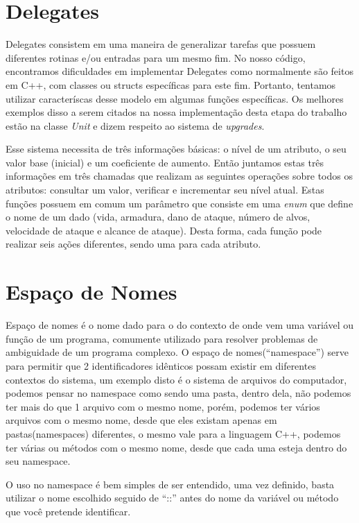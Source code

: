\documentclass[rel_mlp]{iiufrgs}
\begin{document}
 \section{Delegates}

 	Delegates consistem em uma maneira de generalizar tarefas que possuem diferentes rotinas e/ou entradas para um mesmo fim. No nosso código, encontramos dificuldades em implementar Delegates como normalmente são feitos em C++, com classes ou structs específicas para este fim. Portanto, tentamos utilizar caracteríscas desse modelo em algumas funções específicas. Os melhores exemplos disso a serem citados na nossa implementação desta etapa do trabalho estão na classe \textit{Unit} e dizem respeito ao sistema de \textit{upgrades}.

 	Esse sistema necessita de três informações básicas: o nível de um atributo, o seu valor base (inicial) e um coeficiente de aumento. Então juntamos estas três informações em três chamadas que realizam as seguintes operações sobre todos os atributos: consultar um valor, verificar e incrementar seu nível atual. Estas funções possuem em comum um parâmetro que consiste em uma \textit{enum} que define o nome de um dado (vida, armadura, dano de ataque, número de alvos, velocidade de ataque e alcance de ataque). Desta forma, cada função pode realizar seis ações diferentes, sendo uma para cada atributo.

    \section{Espaço de Nomes}
   Espaço de nomes é o nome dado para o do contexto de onde vem uma variável ou função de um programa, comumente utilizado para resolver problemas de ambiguidade de um programa complexo. O espaço de nomes(“namespace”) serve para permitir que 2 identificadores idênticos possam existir em diferentes contextos do sistema, um exemplo disto é o sistema de arquivos do computador, podemos pensar no namespace como sendo uma pasta, dentro dela, não podemos ter mais do que 1 arquivo com o mesmo nome, porém, podemos ter vários arquivos com o mesmo nome, desde que eles existam apenas em pastas(namespaces) diferentes, o mesmo vale para a linguagem C++, podemos ter várias ou métodos com o mesmo nome, desde que cada uma esteja dentro do seu namespace.

   	O uso no namespace é bem simples de ser entendido, uma vez definido, basta utilizar o nome escolhido seguido de “::” antes do nome da variável ou método que você pretende identificar.
\end{document}
